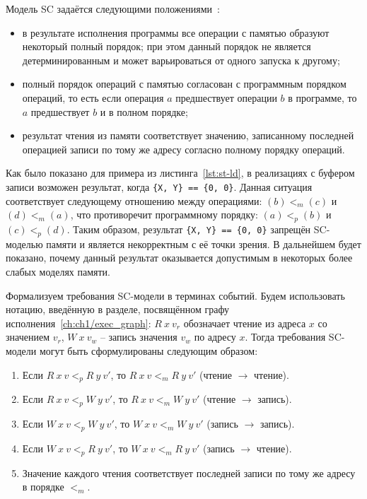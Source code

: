 Модель SC задаётся следующими положениями~\cite{LAMPORT}:
\begin{itemize}
  \item в результате исполнения программы все операции с памятью
    образуют некоторый полный порядок; при этом данный порядок не
    является детерминированным и может варьироваться от одного
    запуска к другому;
  \item полный порядок операций с памятью согласован с программным
    порядком операций, то есть если операция $a$ предшествует
    операции $b$ в программе, то $a$ предшествует $b$ и в полном порядке;
  \item результат чтения из памяти соответствует значению,
    записанному последней операцией записи по тому же адресу согласно
    полному порядку операций.
\end{itemize}

Как было показано для примера из листинга~\ref{lst:st-ld}, в
реализациях с буфером записи возможен результат, когда \texttt{\{X,
Y\} == \{0, 0\}}. Данная ситуация соответствует следующему отношению
между операциями: $(b) <_{m} (c)$ и $(d) <_{m} (a)$, что противоречит
программному порядку: $(a) <_{p} (b)$ и $(c) <_{p} (d)$. Таким
образом, результат \texttt{\{X, Y\} == \{0, 0\}} запрещён SC-моделью
памяти и является некорректным с её точки зрения. В дальнейшем будет
показано, почему данный результат оказывается допустимым в некоторых
более слабых моделях памяти.

Формализуем требования SC-модели в терминах событий. Будем
использовать нотацию, введённую в разделе, посвящённом графу
исполнения~\ref{ch:ch1/exec_graph}: $R\ x\ v_{r}$ обозначает чтение
из адреса $x$ со значением $v_{r}$, $W\ x\ v_{w}$ -- запись значения
$v_{w}$ по адресу $x$. Тогда требования SC-модели могут быть
сформулированы следующим образом:

\begin{enumerate}
  \item Если $R\ x\ v <_{p} R\ y\ v'$, то $R\ x\ v <_{m} R\ y\ v'$
    (чтение $\rightarrow$ чтение).
  \item Если $R\ x\ v <_{p} W\ y\ v'$, то $R\ x\ v <_{m} W\ y\ v'$
    (чтение $\rightarrow$ запись).
  \item Если $W\ x\ v <_{p} W\ y\ v'$, то $W\ x\ v <_{m} W\ y\ v'$
    (запись $\rightarrow$ запись).
  \item Если $W\ x\ v <_{p} R\ y\ v'$, то $W\ x\ v <_{m} R\ y\ v'$
    (запись $\rightarrow$ чтение). \label{the_forth_point}
  \item Значение каждого чтения соответствует последней записи по
    тому же адресу в порядке $<_{m}$.
\end{enumerate}

